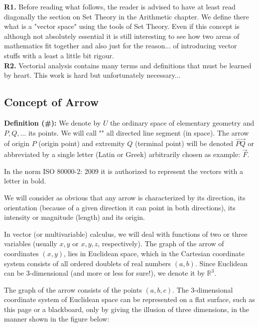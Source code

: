 	\begin{tcolorbox}[title=Remarks,colframe=black,arc=10pt]
	\textbf{R1.} Before reading what follows, the reader is advised to have at least read diagonally the section on Set Theory in the Arithmetic chapter. We define there what is a "vector space" using the tools of Set Theory. Even if this concept  is although not absolutely essential it is still interesting to see how two areas of mathematics fit together and also just for the reason... of introducing vector stuffs with a least a little bit rigour.\\
	
	\textbf{R2.} Vectorial analysis contains many terms and definitions that must be learned by heart. This work is hard but unfortunately necessary...
	\end{tcolorbox}
	
	\pagebreak
	\subsection{Concept of Arrow}	

\textbf{Definition (\#\mydef):} We denote by $U$ the ordinary space of elementary geometry and $P, Q,...$ its points. We will call "" all directed line segment (in space). The arrow of origin $P$ (origin point) and extremity $Q$ (terminal point) will be denoted $\overrightarrow{PQ}$ or abbreviated by a single letter (Latin or Greek) arbitrarily chosen as example: $\overrightarrow{F}$.

	\begin{tcolorbox}[title=Remark,colframe=black,arc=10pt]
In the norm ISO 80000-2: 2009 it is authorized to represent the vectors with a letter in bold.
	\end{tcolorbox}	

We will consider as obvious that any arrow is characterized by its direction, its orientation (because of a given direction it can point in both directions), its intensity or magnitude (length) and its origin.

In vector (or multivariable) calculus, we will deal with functions of two or three variables (usually $x, y$ or $x, y, z$, respectively). The graph of the arrow of coordinates $(x, y)$, lies in Euclidean space, which in the Cartesian coordinate system consists of all ordered doublets of real numbers $(a,b)$. Since Euclidean can be 3-dimensional (and more or less for sure!), we denote it by $\mathbb{R}^3$.

The graph of the arrow consists of the points $(a, b, c)$. The 3-dimensional coordinate system of Euclidean space can be represented on a flat surface, such as this page or a blackboard, only by giving the illusion of three dimensions, in the manner shown in the figure below:

